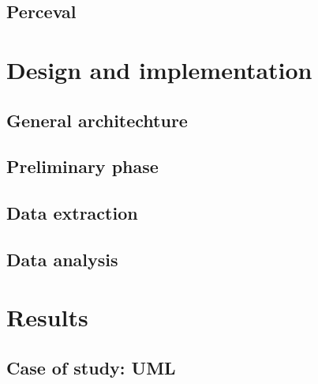 \documentclass[a4paper, 12pt]{book}
\begin{document}
\section{Perceval}
\label{sec:perceval}



\cleardoublepage
\chapter{Design and implementation}

\section{General architechture}
\label{sec:arquitectura}

\section{Preliminary phase}
\label{sec:fase-preliminar}

\section{Data extraction}
\label{sec:extraccion-datos}

\section{Data analysis}
\label{sec:analisis-datos}



\cleardoublepage
\chapter{Results}

\section{Case of study: UML}
\label{sec:caso-estudio-uml}
\end{document}
